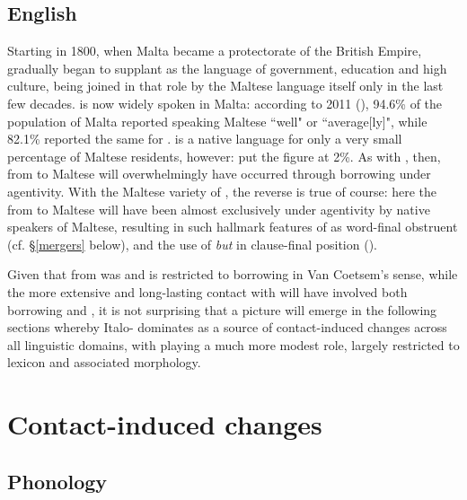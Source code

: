 \documentclass[output=paper]{langsci/langscibook}
\begin{document}
\subsection{English} \label{English}
Starting in 1800, when Malta became a protectorate of the British Empire,  gradually began to supplant  as the language of government, education and high culture, being joined in that role by the Maltese language itself only in the last few decades.  is now widely spoken in Malta: according to 2011  (\citealt[149]{census2011}), 94.6\% of the population of Malta reported speaking Maltese ``well" or ``average[ly]", while 82.1\% reported the same for .  is a native language for only a very small percentage of Maltese residents, however: \cite{scirihavassallo2006} put the figure at 2\%. As with , then,  from  to Maltese will overwhelmingly have occurred through borrowing under  agentivity. With the Maltese variety of , the reverse is true of course: here the  from  to Maltese will have been almost exclusively  under  agentivity by native speakers of Maltese, resulting in such hallmark features of  as word-final obstruent  (cf. §\ref{mergers} below), and the use of \textit{but} in clause-final position (\citealt[527]{Lucas2015}).

Given that  from  was and is restricted to borrowing in Van Coetsem's sense, while the more extensive and long-lasting contact with  will have involved both borrowing and , it is not surprising that a picture will emerge in the following sections whereby Italo- dominates as a source of contact-induced changes across all linguistic domains, with  playing a much more modest role, largely restricted to lexicon and associated  morphology.

\section{Contact-induced changes
}
\subsection{Phonology\footnotemark}
\end{document}
